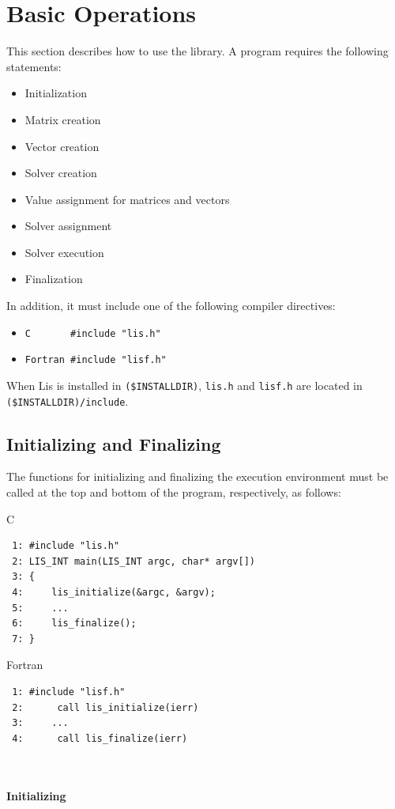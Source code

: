 \documentclass[a4paper]{article}
\begin{document}
\vspace*{5mm}

\newpage
\section{Basic Operations}
This section describes how to use the library. 
A program requires the following statements:
\begin{itemize}
\item Initialization
\item Matrix creation
\item Vector creation
\item Solver creation
\item Value assignment for matrices and vectors
\item Solver assignment
\item Solver execution
\item Finalization
\end{itemize}
In addition, it must include one of the following compiler directives: 
\begin{itemize}
\item \verb+C       #include "lis.h"+
\item \verb+Fortran #include "lisf.h"+
\end{itemize}
When Lis is installed in \verb|($INSTALLDIR)|, {\tt lis.h} and {\tt lisf.h}
are located in \verb|($INSTALLDIR)/include|.

\subsection{Initializing and Finalizing}
The functions for initializing and finalizing the execution environment 
must be called at the top and bottom of the program, respectively, as follows:
\begin{itemsquarebox}[l]{C}
\small
\begin{verbatim}
 1: #include "lis.h"
 2: LIS_INT main(LIS_INT argc, char* argv[])
 3: {
 4:     lis_initialize(&argc, &argv);
 5:     ...
 6:     lis_finalize();
 7: }
\end{verbatim}
\end{itemsquarebox}
\begin{itemsquarebox}[l]{Fortran}
\small
\begin{verbatim}
 1: #include "lisf.h"
 2:      call lis_initialize(ierr) 
 3:     ...
 4:      call lis_finalize(ierr)
\end{verbatim}
\end{itemsquarebox}
\\ \\
\noindent
{\bf Initializing}
\end{document}

